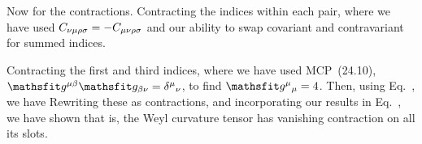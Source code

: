 {	%
	Now for the contractions.  Contracting the indices within each pair,
	where we have used $C_{\nu \mu \rho \sigma} = -C_{\mu \nu \rho \sigma}$ and our ability to swap covariant and contravariant for summed indices.
	
	Contracting the first and third indices,
	where we have used MCP~(24.10), $\sg^{\mu \bet} \sg_{\bet \nu} = \fv{\del}{\mu}{\nu}$, to find $\fv{\sg}{\mu}{\mu} = 4$.  Then, using Eq.~, we have
	Rewriting these as contractions, and incorporating our results in Eq.~, we have shown
	that is, the Weyl curvature tensor has vanishing contraction on all its slots.
	
}
